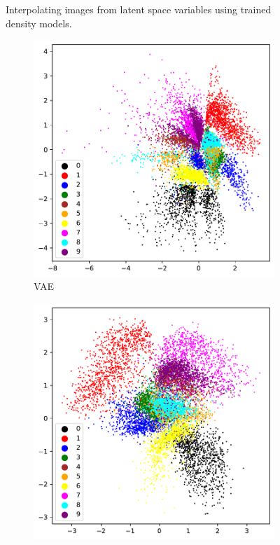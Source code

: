 \begin{figure}[!h]
	\caption{Interpolating images from latent space variables using trained density models.}	
\end{figure}

\begin{figure}[!h]
	\begin{subfigure}[t]{0.49\textwidth}
		\centering
		\includegraphics[width = 1\textwidth]{figures/vae/clustering}
		\caption{VAE}
		\label{fig:vae:clustering}
	\end{subfigure}
	\begin{subfigure}[t]{0.49\textwidth}
		\centering
		\includegraphics[width = 1\textwidth]{figures/cvae/clustering}

\end{subfigure}
\end{figure}
